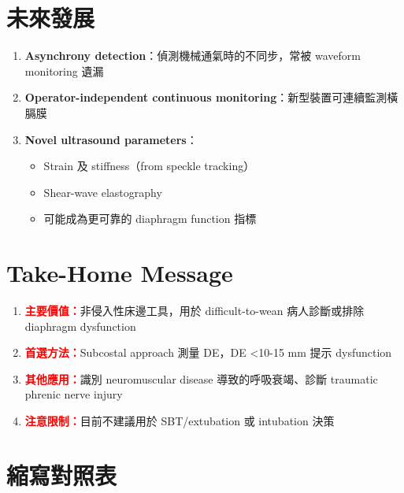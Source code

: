 \documentclass[12pt,a4paper]{article}
\begin{document}
\section{未來發展}

\begin{enumerate}
    \item \textbf{Asynchrony detection}：偵測機械通氣時的不同步，常被 waveform monitoring 遺漏
    \item \textbf{Operator-independent continuous monitoring}：新型裝置可連續監測橫膈膜
    \item \textbf{Novel ultrasound parameters}：
    \begin{itemize}
        \item Strain 及 stiffness（from speckle tracking）
        \item Shear-wave elastography
        \item 可能成為更可靠的 diaphragm function 指標
    \end{itemize}
\end{enumerate}

\section{Take-Home Message}

\begin{enumerate}
    \item \textcolor{red}{\textbf{主要價值：}}非侵入性床邊工具，用於 difficult-to-wean 病人診斷或排除 diaphragm dysfunction
    \item \textcolor{red}{\textbf{首選方法：}}Subcostal approach 測量 DE，DE <10-15 mm 提示 dysfunction
    \item \textcolor{red}{\textbf{其他應用：}}識別 neuromuscular disease 導致的呼吸衰竭、診斷 traumatic phrenic nerve injury
    \item \textcolor{red}{\textbf{注意限制：}}目前不建議用於 SBT/extubation 或 intubation 決策
\end{enumerate}

\section{縮寫對照表}
\end{document}
